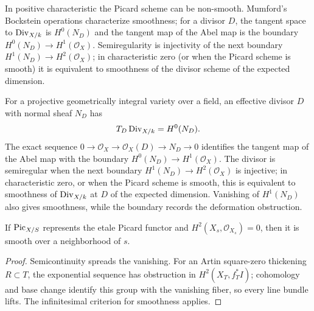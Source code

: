 \begin{remark}\label{kps-rmk-semi-regularity}
In positive characteristic the Picard scheme can be non-smooth. Mumford's
Bockstein operations characterize smoothness; for a divisor $D$, the tangent
space to $\operatorname{Div}_{X/k}$ is $H^0(N_D)$ and the tangent map of the Abel map is the
boundary $H^0(N_D)\to H^1(\mathcal O_X)$. Semiregularity is injectivity of the
next boundary $H^1(N_D)\to H^2(\mathcal O_X)$; in characteristic zero (or when
the Picard scheme is smooth) it is equivalent to smoothness of the divisor
scheme of the expected dimension.
\end{remark}

\begin{remark}\label{kps-rmk-divisor-tangent}
For a projective geometrically integral variety over a field, an effective
divisor $D$ with normal sheaf $N_D$ has
\[
 T_D\operatorname{Div}_{X/k}=H^0(N_D).
\]
The exact sequence $0\to\mathcal O_X\to\mathcal O_X(D)\to N_D\to0$
identifies the tangent map of the Abel map with the boundary
$H^0(N_D)\to H^1(\mathcal O_X)$. The divisor is semiregular when the next
boundary $H^1(N_D)\to H^2(\mathcal O_X)$ is injective; in characteristic
zero, or when the Picard scheme is smooth, this is equivalent to smoothness
of $\operatorname{Div}_{X/k}$ at $D$ of the expected dimension. Vanishing of $H^1(N_D)$
also gives smoothness, while the boundary records the deformation obstruction.
\end{remark}

\begin{proposition}\label{kps-prop-H2}
If $\operatorname{Pic}_{X/S}$ represents the etale Picard functor and
$H^2(X_s,\mathcal O_{X_s})=0$, then it is smooth over a neighborhood of $s$.
\end{proposition}
\begin{proof}
Semicontinuity spreads the vanishing. For an Artin square-zero thickening
$R\subset T$, the exponential sequence has obstruction in
$H^2(X_T,f_T^*I)$; cohomology and base change identify this group with the
vanishing fiber, so every line bundle lifts. The infinitesimal criterion for
smoothness applies.
\end{proof}

